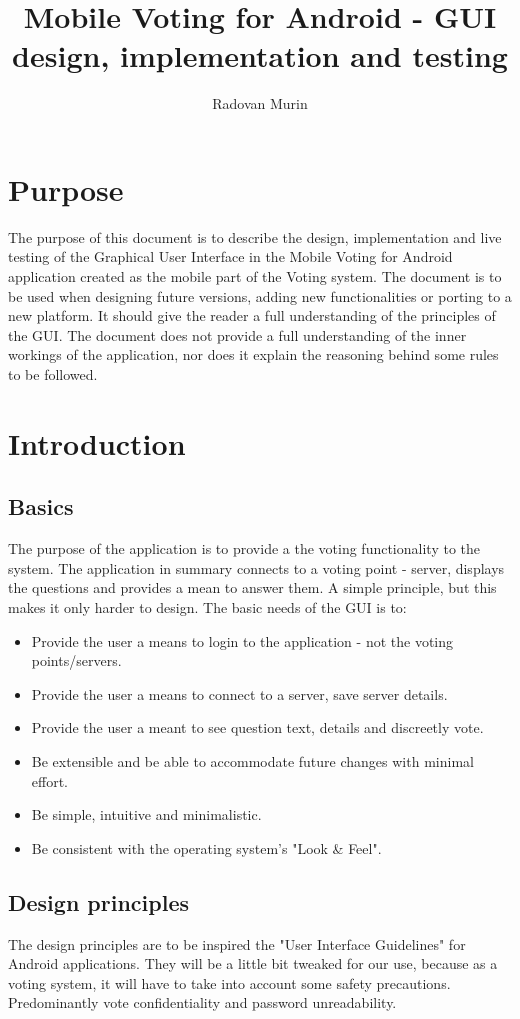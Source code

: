 \documentclass[11pt]{article} %
\title{Mobile Voting for Android - GUI design, implementation and testing}
\author{Radovan Murin}
\begin{document}
\maketitle
\tableofcontents
\newpage
\section{Purpose}

The purpose of this document is to describe the design, implementation and live testing of the Graphical User Interface in the Mobile Voting for Android application created as the mobile part of the Voting system. The document is to be used when designing future versions, adding new functionalities or porting to a new platform. It should give the reader a full understanding of the principles of the GUI. The document does not provide a full understanding of the inner workings of the application, nor does it explain the reasoning behind some rules to be followed.

\section{Introduction}
\subsection{Basics}
The purpose of the application is to provide a the voting functionality to the system. The application in summary connects to a voting point - server, displays the questions and provides a mean to answer them. A simple principle, but this makes it only harder to design.
The basic needs of the GUI is to:
\begin{itemize}
\item Provide the user a means to login to the application - not the voting points/servers.
\item Provide the user a means to connect to a server, save server details.
\item Provide the user a meant to see question text, details and discreetly vote.
\item Be extensible and be able to accommodate future changes with minimal effort. 
\item Be simple, intuitive and minimalistic.
\item Be consistent with the operating system's "Look \& Feel".
\end{itemize}
\subsection{Design principles}
The design principles are to be inspired the "User Interface Guidelines" for Android applications\cite{uiGuidelines}. They will be a little bit tweaked for our use, because as a voting system, it will have to take into account some safety precautions. Predominantly vote confidentiality and password unreadability.
\end{document}
